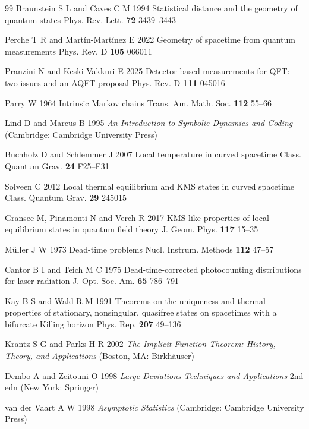\begin{thebibliography}{99}
Braunstein S L and Caves C M 1994 Statistical distance and the geometry of quantum states Phys. Rev. Lett. \textbf{72} 3439--3443

Perche T R and Mart\'in-Mart\'inez E 2022 Geometry of spacetime from quantum measurements Phys. Rev. D \textbf{105} 066011

Pranzini N and Keski-Vakkuri E 2025 Detector-based measurements for QFT: two issues and an AQFT proposal Phys. Rev. D \textbf{111} 045016

Parry W 1964 Intrinsic Markov chains Trans. Am. Math. Soc. \textbf{112} 55--66

Lind D and Marcus B 1995 \emph{An Introduction to Symbolic Dynamics and Coding} (Cambridge: Cambridge University Press)

Buchholz D and Schlemmer J 2007 Local temperature in curved spacetime Class. Quantum Grav. \textbf{24} F25--F31

Solveen C 2012 Local thermal equilibrium and KMS states in curved spacetime Class. Quantum Grav. \textbf{29} 245015

Gransee M, Pinamonti N and Verch R 2017 KMS-like properties of local equilibrium states in quantum field theory J. Geom. Phys. \textbf{117} 15--35

M\"uller J W 1973 Dead-time problems Nucl. Instrum. Methods \textbf{112} 47--57

Cantor B I and Teich M C 1975 Dead-time-corrected photocounting distributions for laser radiation J. Opt. Soc. Am. \textbf{65} 786--791

Kay B S and Wald R M 1991 Theorems on the uniqueness and thermal properties of stationary, nonsingular, quasifree states on spacetimes with a bifurcate Killing horizon Phys. Rep. \textbf{207} 49--136

Krantz S G and Parks H R 2002 \emph{The Implicit Function Theorem: History, Theory, and Applications} (Boston, MA: Birkh\"auser)

Dembo A and Zeitouni O 1998 \emph{Large Deviations Techniques and Applications} 2nd edn (New York: Springer)

van der Vaart A W 1998 \emph{Asymptotic Statistics} (Cambridge: Cambridge University Press)


\end{thebibliography}
